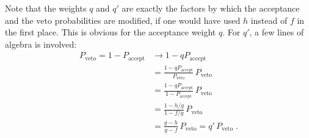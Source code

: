 \documentclass[a4paper]{scrartcl}
\begin{document}
Note that the weights $q$ and $q'$ are exactly the factors by which the
acceptance and the veto probabilities are modified, if one would have used $h$
instead of $f$ in the first place.  This is obvious for the acceptance weight
$q$. For $q'$, a few lines of algebra is involved:
\begin{align}
    P_\text{veto}
    = 1 - P_\text{accept}
    &\to 1 - q P_\text{accept} \\
    &= \frac{1-q P_\text{accept}}{P_\text{veto}} \, P_\text{veto} \\
    &= \frac{1-q P_\text{accept}}{1-P_\text{accept}} \, P_\text{veto} \\
    &= \frac{1 - h/g}{1 - f/g} \, P_\text{veto} \\
    &= \frac{g - h}{g - f} \, P_\text{veto} = q' \, P_\text{veto}\;.
\end{align}



\end{document}
